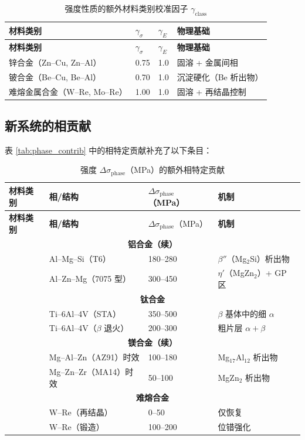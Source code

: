 \documentclass[12pt,a4paper]{article}
\begin{document}
	\begin{longtable}{p{3.5cm} p{2.5cm} p{2.5cm} p{5cm}}
		\caption{强度性质的额外材料类别校准因子 $\gamma_{\text{class}}$}\label{tab:gamma_class_extended}\\
		\toprule
		\textbf{材料类别} & $\gamma_{\sigma}$ & $\gamma_{E}$ & \textbf{物理基础} \\
		\midrule
		\endfirsthead
		\toprule
		\textbf{材料类别} & $\gamma_{\sigma}$ & $\gamma_{E}$ & \textbf{物理基础} \\
		\midrule
		\endhead
		锌合金（Zn–Cu, Zn–Al） & 0.75 & 1.0 & 固溶 + 金属间相 \\
		铍合金（Be–Cu, Be–Al） & 0.70 & 1.0 & 沉淀硬化（Be 析出物） \\
		难熔金属合金（W–Re, Mo–Re） & 1.00 & 1.0 & 固溶 + 再结晶控制 \\
		\bottomrule
	\end{longtable}
	
	\subsection*{新系统的相贡献}
	表 \ref{tab:phase_contrib} 中的相特定贡献补充了以下条目：
	
	\begin{longtable}{p{3.5cm} p{3.0cm} p{3.0cm} p{4cm}}
		\caption{强度 $\Delta\sigma_{\text{phase}}$（MPa）的额外相特定贡献}\label{tab:phase_contrib_extended}\\
		\toprule
		\textbf{材料类别} & \textbf{相/结构} & $\Delta\sigma_{\text{phase}}$（MPa） & \textbf{机制} \\
		\midrule
		\endfirsthead
		\toprule
		\textbf{材料类别} & \textbf{相/结构} & $\Delta\sigma_{\text{phase}}$（MPa） & \textbf{机制} \\
		\midrule
		\endhead
		\multicolumn{4}{c}{\textbf{铝合金（续）}} \\
		& Al–Mg–Si（T6） & 180–280 & $\beta''$（Mg$_2$Si）析出物 \\
		& Al–Zn–Mg（7075 型） & 300–450 & $\eta'$（MgZn$_2$）+ GP 区 \\
		\hline
		\multicolumn{4}{c}{\textbf{钛合金}} \\
		& Ti–6Al–4V（STA） & 350–500 & $\beta$ 基体中的细 $\alpha$ \\
		& Ti–6Al–4V（$\beta$ 退火） & 200–300 & 粗片层 $\alpha+\beta$ \\
		\hline
		\multicolumn{4}{c}{\textbf{镁合金（续）}} \\
		& Mg–Al–Zn（AZ91）时效 & 100–180 & Mg$_{17}$Al$_{12}$ 析出物 \\
		& Mg–Zn–Zr（MA14）时效 & 50–100 & MgZn$_2$ 析出物 \\
		\hline
		\multicolumn{4}{c}{\textbf{难熔合金}} \\
		& W–Re（再结晶） & 0–50 & 仅恢复 \\
		& W–Re（锻造） & 100–200 & 位错强化 \\
		\bottomrule
	\end{longtable}
	
\end{document}
